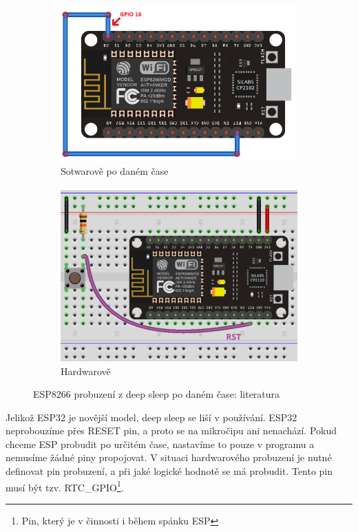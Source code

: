 \documentclass[a4paper, 12pt]{report}
\begin{document}
    \begin{figure}[h!]
        \centering
        \begin{subfigure}[b]{0.4\linewidth}
            \includegraphics[width=\linewidth]{images/ESP8266_timed_deepsleep}
            \caption{Sotwarově po daném čase}
        \end{subfigure}
        \begin{subfigure}[b]{0.4\linewidth}
            \includegraphics[width=\linewidth]{images/ESP8266_pressed_deepsleep}
            \caption{Hardwarově}
        \end{subfigure}
        \caption{ESP8266 probuzení z deep sleep po daném čase: literatura~\cite{randomnerd}}
        \label{fig:esp8266_timed_pressed_deepsleep}
    \end{figure}\par
    Jelikož ESP32 je novější model, deep sleep se liší v používání.
    ESP32 neprobouzíme přes RESET pin, a proto se na mikročipu ani nenachází.
    Pokud chceme ESP probudit po určitém čase, nastavíme to pouze v programu a nemusíme žádné piny propojovat.
    V situaci hardwarového probuzení je nutné definovat pin probuzení, a při jaké logické hodnotě se má probudit.
    Tento pin musí být tzv. RTC\_GPIO\footnote{Pin, který je v činnosti i během spánku ESP}.
\end{document}
